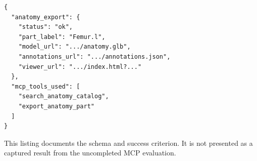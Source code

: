 \begin{lstlisting}[language={},caption={Required structure of a verified MCP success response.}]
{
  "anatomy_export": {
    "status": "ok",
    "part_label": "Femur.l",
    "model_url": ".../anatomy.glb",
    "annotations_url": ".../annotations.json",
    "viewer_url": ".../index.html?..."
  },
  "mcp_tools_used": [
    "search_anatomy_catalog",
    "export_anatomy_part"
  ]
}
\end{lstlisting}

This listing documents the schema and success criterion. It is not presented as a captured result from the uncompleted MCP evaluation.
